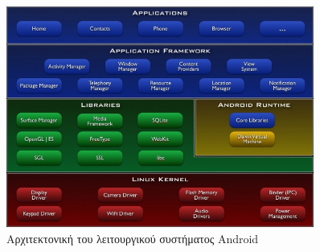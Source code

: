 		\begin{figure}[h]
			\centering
			\includegraphics[width=0.9\textwidth]{android_system_architecture.jpg}
			\caption{Αρχιτεκτονική του λειτουργικού συστήματος Android}
			\label{fig:android_system_architecture}
		\end{figure}
		
